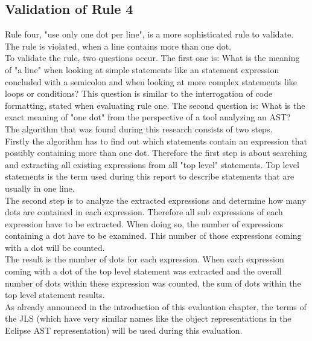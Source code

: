 \subsection*{Validation of Rule 4}
Rule four, "use only one dot per line", is a more sophisticated rule to validate. The rule is violated, when a line contains more than one dot. 
\\

To validate the rule, two questions occur. The first one is: What is the meaning of "a line" when looking at simple statements like an statement expression concluded with a semicolon and when looking at more complex statements like loops or conditions? This question is similar to the interrogation of code formatting, stated when evaluating rule one. The second question is: What is the exact meaning of "one dot" from the perspective of a tool analyzing an \ac{AST}?
\\

The algorithm that was found during this research consists of two steps. 
\\

Firstly the algorithm has to find out which statements contain an expression that possibly containing more than one dot. Therefore the first step is about searching and extracting all existing expressions from all "top level" statements. Top level statements is the term used during this report to describe statements that are usually in one line. 
\\

The second step is to analyze the extracted expressions and determine how many dots are contained in each expression. Therefore all sub expressions of each expression have to be extracted. When doing so, the number of expressions containing a dot have to be examined. This number of those expressions coming with a dot will be counted. 
\\

The result is the number of dots for each expression. When each expression coming with a dot of the top level statement was extracted and the overall number of dots within these expression was counted, the sum of dots within the top level statement results. 
\\

As already announced in the introduction of this evaluation chapter, the terms of the \ac{JLS} (which have very similar names like the object representations in the Eclipse \ac{AST} representation) will be used during this evaluation. 
\\

